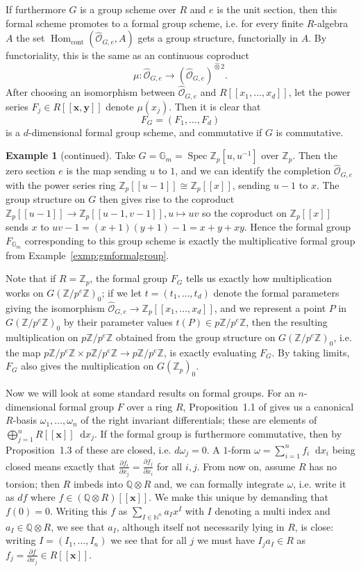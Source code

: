 \documentclass[12pt]{article}
\newcommand{\N}{\mathbb{N}}
\newcommand{\Z}{\mathbb{Z}}
\renewcommand{\G}{\mathbb{G}}
\newcommand{\Q}{\mathbb{Q}}
\newcommand{\vx}{\mathbf{x}}
\newcommand{\vy}{\mathbf{y}}
\renewcommand{\O}{\mathcal{O}}
\newcommand*\diff{\mathop{}\!\mathrm{d}}
\newcommand{\tensor}{\otimes}
\DeclareMathOperator{\Hom}{Hom}
\DeclareMathOperator{\Spec}{Spec}
\theoremstyle{plain}
\theoremstyle{definition}
\newtheorem{exmp}[thm]{Example} %
\theoremstyle{remark}
\begin{document}
If furthermore $G$ is a group scheme over $R$ and $e$ is the unit section, then this formal scheme promotes to a formal group scheme, i.e. for every finite $R$-algebra $A$ the set $\Hom_{\text{cont}}(\widehat{\O}_{G,e},A)$ gets a group structure, functorially in $A$. By functoriality, this is the same as an continuous coproduct \[\mu: \widehat{\O}_{G,e} \to \left(\widehat{\O}_{G,e}\right)^{\widehat{\tensor} 2}.\]
After choosing an isomorphism between $\widehat{\O}_{G,e}$ and $R[[x_1,\dots,x_d]]$, let the power series $F_j \in R[[\vx,\vy]]$ denote $\mu(x_j)$. Then it is clear that \[F_G = (F_1,\dots,F_d)\] is a $d$-dimensional formal group scheme, and commutative if $G$ is commutative.
\addtocounter{thm}{-3}
\begin{exmp}[continued]
\label{exmp:gmtoformal}
Take $G = \G_m = \Spec \Z_p[u,u^{-1}]$ over $\Z_p$. Then the zero section $e$ is the map sending $u$ to $1$, and we can identify the completion $\widehat{\O}_{G,e}$ with the power series ring $\Z_p[[u-1]] \cong \Z_p[[x]]$, sending $u-1$ to $x$. The group structure on $G$ then gives rise to the coproduct $\Z_p[[u-1]] \to \Z_p[[u-1,v-1]], u \mapsto uv$ so the coproduct on $\Z_p[[x]]$ sends $x$ to $uv-1 = (x+1)(y+1) -1 = x + y + xy$. Hence the formal group $F_{\G_m}$ corresponding to this group scheme is exactly the multiplicative formal group from Example~\ref{exmp:gmformalgroup}.
\end{exmp}

Note that if $R = \Z_p$, the formal group $F_G$ tells us exactly how multiplication works on $G(\Z/p^e\Z)_0$; if we let $t = (t_1,\dots,t_d)$ denote the formal parameters giving the isomorphism $\widehat{\O}_{G,e} \to \Z_p[[x_1,\dots,x_d]]$, and we represent a point $P$ in $G(\Z/p^e\Z)_0$ by their parameter values $t(P) \in p\Z/p^e\Z$, then the resulting multiplication on $p\Z/p^e\Z$ obtained from the group structure on $G(\Z/p^e\Z)_0$, i.e. the map $p\Z/p^e\Z \times p\Z/p^e\Z \to p\Z/p^e\Z$, is exactly evaluating $F_G$. By taking limits, $F_G$ also gives the multiplication on $G(\Z_p)_0$.

Now we will look at some standard results on formal groups. For an $n$-dimensional formal group $F$ over a ring $R$, Proposition~1.1 of \cite{honda70} gives us a canonical $R$-basis $\omega_1,\dots,\omega_n$ of the right invariant differentials; these are elements of $\bigoplus_{j=1}^n R[[\vx]] \diff x_j$. If the formal group is furthermore commutative, then by Proposition~1.3 of \cite{honda70} these are closed, i.e. $d\omega_j = 0$. A $1$-form $\omega = \sum_{i=1}^n f_i \diff x_i$ being closed means exactly that $\frac{\partial f_i}{\partial x_j} = \frac{\partial f_j}{\partial x_i}$ for all $i,j$. From now on, assume $R$ has no torsion; then $R$ imbeds into $\Q \tensor R$ and, we can formally integrate $\omega$, i.e. write it as $df$ where $f \in (\Q\tensor R)[[\vx]]$. We make this unique by demanding that $f(0) = 0$. Writing this $f$ as $\sum_{I \in \N^n} a_I x^I$ with $I$ denoting a multi index and $a_I \in \Q\tensor R$, we see that $a_I$, although itself not necessarily lying in $R$, is close: writing $I = (I_1,\dots,I_n)$ we see that for all $j$ we must have $I_j a_I \in R$ as $f_j = \frac{\partial f}{\partial x_j} \in R[[\vx]]$.
\end{document}
